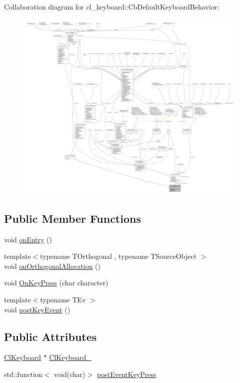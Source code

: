 Collaboration diagram for cl\+\_\+keyboard\+:\+:Cb\+Default\+Keyboard\+Behavior\+:
\nopagebreak
\begin{figure}[H]
\begin{center}
\leavevmode
\includegraphics[width=350pt]{classcl__keyboard_1_1CbDefaultKeyboardBehavior__coll__graph}
\end{center}
\end{figure}
\subsection*{Public Member Functions}
\begin{DoxyCompactItemize}
\item 
void \hyperlink{classcl__keyboard_1_1CbDefaultKeyboardBehavior_a06e49d8c78aeffecf74c27b05f529a3a}{on\+Entry} ()
\item 
{\footnotesize template$<$typename T\+Orthogonal , typename T\+Source\+Object $>$ }\\void \hyperlink{classcl__keyboard_1_1CbDefaultKeyboardBehavior_af6cae1d7ce3f51e6843d3ac5da7966dc}{on\+Orthogonal\+Allocation} ()
\item 
void \hyperlink{classcl__keyboard_1_1CbDefaultKeyboardBehavior_aa834f8e626a306920e536e7535041ac3}{On\+Key\+Press} (char character)
\item 
{\footnotesize template$<$typename T\+Ev $>$ }\\void \hyperlink{classcl__keyboard_1_1CbDefaultKeyboardBehavior_afe6105db2d58fee99754cb4a47835988}{post\+Key\+Event} ()
\end{DoxyCompactItemize}
\subsection*{Public Attributes}
\begin{DoxyCompactItemize}
\item 
\hyperlink{classcl__keyboard_1_1ClKeyboard}{Cl\+Keyboard} $\ast$ \hyperlink{classcl__keyboard_1_1CbDefaultKeyboardBehavior_a482e94248b8e6fbac0973d3dec0cc20b}{Cl\+Keyboard\+\_\+}
\item 
std\+::function$<$ void(char)$>$ \hyperlink{classcl__keyboard_1_1CbDefaultKeyboardBehavior_abd29833a0f94aa1d5aa1834d15ab1281}{post\+Event\+Key\+Press}
\end{DoxyCompactItemize}
